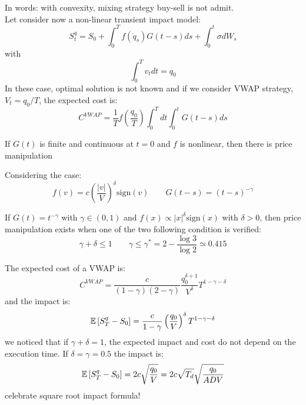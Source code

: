 In words: with convexity, mixing strategy buy-sell is not admit.\\
Let consider now a non-linear transient impact model:
\[
S_t^q = S_0 + \int_0^T f(\dot{q}_s)G(t-s)ds + \int_0^t \sigma dW_s
\]
with
\[
\int_0^T v_tdt = q_0
\]
In these case, optimal solution is not known and if we consider VWAP strategy, $V_t = q_0/T$, the expected cost is:
\[
C^{VWAP} = \frac{1}{T} f\left(\frac{q_0}{T}\right) \int_0^T dt \int_0^t G(t-s)ds
\]
\begin{mytheorem}
	If $G(t)$ is finite and continuous at $t=0$ and $f$ is nonlinear, then there is price manipulation
\end{mytheorem}
Considering the case:
\[
f(v) = c \left(\frac{|v|}{V}\right)^{\delta} \text{sign}(v) \qquad G(t-s) = (t-s)^{-\gamma}
\]
\begin{mytheorem}
If $G(t) = t^{-\gamma}$ with $\gamma \in (0,1)$ and $f(x)\propto|x|^{\delta} \text{sign}(x)$ with $\delta>0$, then price manipulation exists when one of the two following condition is verified:
\[
\gamma + \delta \leq 1 \qquad \gamma \leq \gamma^* = 2-\frac{\log 3}{\log 2}\simeq 0.415
\]
\end{mytheorem}
The expected cost of a VWAP is:
\[
C^{VWAP} = \frac{c}{(1-\gamma)(2-\gamma)} \frac{q_0^{\delta + 1}}{V^\delta}T^{1-\gamma-\delta}
\]
and the impact is:
\[
\mathbb{E}\left[S^q_T -S_0\right] = \frac{c}{1-\gamma} \left(\frac{q_0}{V}\right)^\delta T^{1-\gamma-\delta}
\]
we noticed that if $\gamma + \delta =1$, the expected impact and cost do not depend on the execution time. If $\delta = \gamma = 0.5$ the impact is:
\[
\mathbb{E}\left[S_T^q - S_0\right] = 2c\sqrt{\frac{q_0}{V}} = 2c\sqrt{T_d}\sqrt{\frac{q_0}{ADV}}
\]
celebrate square root impact formula!
